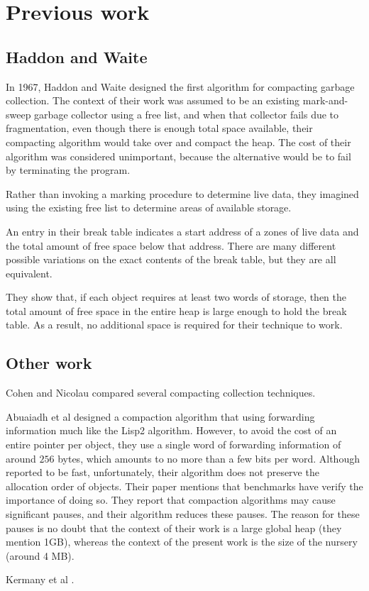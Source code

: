 \section{Previous work}

\subsection{Haddon and Waite}

In 1967, Haddon and Waite \cite{Haddon:1967} designed the first
algorithm for compacting garbage collection.  The context of their
work was assumed to be an existing mark-and-sweep garbage collector
using a free list, and when that collector fails due to fragmentation,
even though there is enough total space available, their compacting
algorithm would take over and compact the heap.  The cost of their
algorithm was considered unimportant, because the alternative would be
to fail by terminating the program.

Rather than invoking a marking procedure to determine live data, they
imagined using the existing free list to determine areas of available
storage. 

An entry in their break table indicates a start address of a zones of
live data and the total amount of free space below that address.
There are many different possible variations on the exact contents of
the break table, but they are all equivalent.

They show that, if each object requires at least two words of storage,
then the total amount of free space in the entire heap is large enough
to hold the break table.  As a result, no additional space is
required for their technique to work.

\subsection{Other work}

Cohen and Nicolau \cite{Cohen:1983:CCA:69575.357226} compared several
compacting collection techniques.

Abuaiadh et al \cite{Abuaiadh:2004:EPH:1028976.1028995} designed a
compaction algorithm that using forwarding information much like the
Lisp2 algorithm.  However, to avoid the cost of an entire pointer per
object, they use a single word of forwarding information of around
$256$ bytes, which amounts to no more than a few bits per word.
Although reported to be fast, unfortunately, their algorithm does not
preserve the allocation order of objects.  Their paper mentions that
benchmarks have verify the importance of doing so.  They report that
compaction algorithms may cause significant pauses, and their
algorithm reduces these pauses.  The reason for these pauses is no
doubt that the context of their work is a large global heap (they
mention 1GB), whereas the context of the present work is the size of
the nursery (around 4 MB).

Kermany et al \cite{Kermany:2006:CCI:1133981.1134023}.
